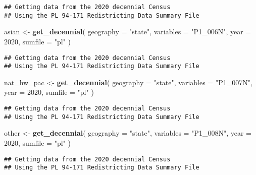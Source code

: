 \documentclass[
]{article}
\newenvironment{Shaded}{\begin{snugshade}}{\end{snugshade}}
\newcommand{\AttributeTok}[1]{\textcolor[rgb]{0.13,0.29,0.53}{#1}}
\newcommand{\DecValTok}[1]{\textcolor[rgb]{0.00,0.00,0.81}{#1}}
\newcommand{\FunctionTok}[1]{\textcolor[rgb]{0.13,0.29,0.53}{\textbf{#1}}}
\newcommand{\NormalTok}[1]{#1}
\newcommand{\OtherTok}[1]{\textcolor[rgb]{0.56,0.35,0.01}{#1}}
\newcommand{\StringTok}[1]{\textcolor[rgb]{0.31,0.60,0.02}{#1}}
\begin{document}
\begin{verbatim}
## Getting data from the 2020 decennial Census
## Using the PL 94-171 Redistricting Data Summary File
\end{verbatim}

\begin{Shaded}
\begin{Highlighting}[]
\NormalTok{asian }\OtherTok{\textless{}{-}} \FunctionTok{get\_decennial}\NormalTok{(}
  \AttributeTok{geography =} \StringTok{"state"}\NormalTok{,}
  \AttributeTok{variables =} \StringTok{"P1\_006N"}\NormalTok{,}
  \AttributeTok{year =} \DecValTok{2020}\NormalTok{,}
  \AttributeTok{sumfile =} \StringTok{"pl"}
\NormalTok{)}
\end{Highlighting}
\end{Shaded}

\begin{verbatim}
## Getting data from the 2020 decennial Census
## Using the PL 94-171 Redistricting Data Summary File
\end{verbatim}

\begin{Shaded}
\begin{Highlighting}[]
\NormalTok{nat\_hw\_pac }\OtherTok{\textless{}{-}} \FunctionTok{get\_decennial}\NormalTok{(}
  \AttributeTok{geography =} \StringTok{"state"}\NormalTok{,}
  \AttributeTok{variables =} \StringTok{"P1\_007N"}\NormalTok{,}
  \AttributeTok{year =} \DecValTok{2020}\NormalTok{,}
  \AttributeTok{sumfile =} \StringTok{"pl"}
\NormalTok{)}
\end{Highlighting}
\end{Shaded}

\begin{verbatim}
## Getting data from the 2020 decennial Census
## Using the PL 94-171 Redistricting Data Summary File
\end{verbatim}

\begin{Shaded}
\begin{Highlighting}[]
\NormalTok{other }\OtherTok{\textless{}{-}} \FunctionTok{get\_decennial}\NormalTok{(}
  \AttributeTok{geography =} \StringTok{"state"}\NormalTok{,}
  \AttributeTok{variables =} \StringTok{"P1\_008N"}\NormalTok{,}
  \AttributeTok{year =} \DecValTok{2020}\NormalTok{,}
  \AttributeTok{sumfile =} \StringTok{"pl"}
\NormalTok{)}
\end{Highlighting}
\end{Shaded}

\begin{verbatim}
## Getting data from the 2020 decennial Census
## Using the PL 94-171 Redistricting Data Summary File
\end{verbatim}
\end{document}
